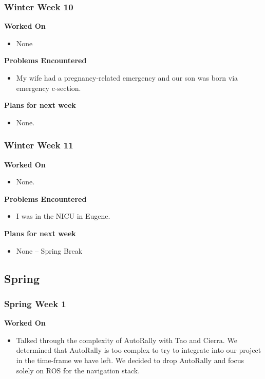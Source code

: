 \documentclass[compsoc,draftclsnofoot,onecolumn,10pt]{IEEEtran}
\begin{document}
\subsubsection*{Winter Week 10}
\textbf{Worked On}
\begin{itemize}
    \item None
\end{itemize}

\textbf{Problems Encountered}
\begin{itemize}
    \item My wife had a pregnancy-related emergency and our son was born via emergency c-section.
\end{itemize}

\textbf{Plans for next week}
\begin{itemize}
    \item None.
\end{itemize}


\subsubsection*{Winter Week 11}
\textbf{Worked On}
\begin{itemize}
    \item None.
\end{itemize}

\textbf{Problems Encountered}
\begin{itemize}
    \item I was in the NICU in Eugene.
\end{itemize}

\textbf{Plans for next week}
\begin{itemize}
    \item None -- Spring Break
\end{itemize}

\subsection{Spring}
\subsubsection*{Spring Week 1}
\textbf{Worked On}
\begin{itemize}
    \item Talked through the complexity of AutoRally with Tao and Cierra. We determined that AutoRally is too complex to try to integrate into our project in the time-frame we have left. We decided to drop AutoRally and focus solely on ROS for the navigation stack.
\end{itemize}
\end{document}
